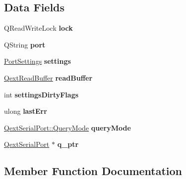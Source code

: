 \subsection*{Data Fields}
\begin{DoxyCompactItemize}
\item 
\mbox{\label{class_qext_serial_port_private_ac50b62eb19d05a9bff4834597e262634}} 
Q\+Read\+Write\+Lock {\bfseries lock}
\item 
\mbox{\label{class_qext_serial_port_private_aaf8fe7ba2a5a0ded3d4891fd3367228e}} 
Q\+String {\bfseries port}
\item 
\mbox{\label{class_qext_serial_port_private_a68d854a17f922fcc5c4698b27dbcd3ae}} 
\mbox{\hyperlink{struct_port_settings}{Port\+Settings}} {\bfseries settings}
\item 
\mbox{\label{class_qext_serial_port_private_aa44d5dac82fd827dae0a2de824089260}} 
\mbox{\hyperlink{class_qext_read_buffer}{Qext\+Read\+Buffer}} {\bfseries read\+Buffer}
\item 
\mbox{\label{class_qext_serial_port_private_acaeb889a706f5a44e5c7105f7e607c54}} 
int {\bfseries settings\+Dirty\+Flags}
\item 
\mbox{\label{class_qext_serial_port_private_a5785c134b645f61962ccf793ca502b52}} 
ulong {\bfseries last\+Err}
\item 
\mbox{\label{class_qext_serial_port_private_aef00ece6acd900d6206c20bbbeb9aecd}} 
\mbox{\hyperlink{class_qext_serial_port_a269e1f3656224a10c321bd70ab89cf64}{Qext\+Serial\+Port\+::\+Query\+Mode}} {\bfseries query\+Mode}
\item 
\mbox{\label{class_qext_serial_port_private_a1242f6a4e3717806ef4d2335d48f8672}} 
\mbox{\hyperlink{class_qext_serial_port}{Qext\+Serial\+Port}} $\ast$ {\bfseries q\+\_\+ptr}
\end{DoxyCompactItemize}


\subsection{Member Function Documentation}
\mbox{\label{class_qext_serial_port_private_a8ef78d13b2e0729836cd7b159bee48f2}} 
